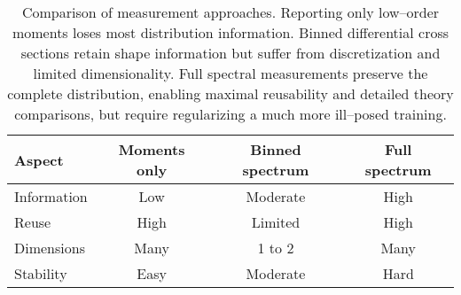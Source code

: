 \begin{table}
    \label{tab:meas_compare}
    \centering
    \caption{Comparison of measurement approaches.
    Reporting only low--order moments loses most distribution information.
    Binned differential cross sections retain shape information but suffer from discretization and limited dimensionality.
    Full spectral measurements preserve the complete distribution, enabling maximal reusability and detailed theory comparisons, but require regularizing a much more ill--posed training.
    }
    \begin{tabular}{lccc}
        \toprule
        \textbf{Aspect} & \textbf{Moments only} & \textbf{Binned spectrum} & \textbf{Full spectrum} \\
        \midrule
        Information           & Low   & Moderate & High \\
        Reuse         & High      & Limited  & High \\
        Dimensions    & Many       & 1 to 2   & Many \\
        Stability              & Easy & Moderate & Hard \\
        \bottomrule
    \end{tabular}
\end{table}